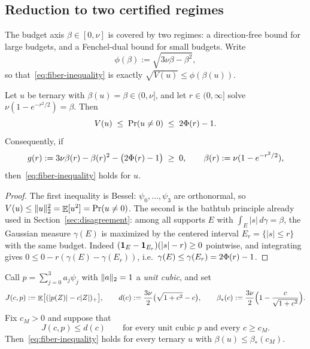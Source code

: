 \subsection{Reduction to two certified regimes}
\label{app:fq1-reduction}

The budget axis $\beta\in[0,\nu]$ is covered by two regimes: a direction-free bound for large budgets, and a Fenchel-dual bound for small budgets. Write
\[
        \phi(\beta):=\sqrt{3\nu\beta-\beta^2},
\]
so that~\eqref{eq:fiber-inequality} is exactly $\sqrt{V(u)}\le\phi(\beta(u))$.

\begin{lemma}\label{lem:highbudget}
Let $u$ be ternary with $\beta(u)=\beta\in(0,\nu]$, and let $r\in(0,\infty]$ solve $\nu(1-e^{-r^2/2})=\beta$. Then
\[
        V(u)\;\le\;\Pr(u\neq0)\;\le\;2\Phi(r)-1 .
\]
Consequently, if
\begin{equation}
        g(r):=3\nu\beta(r)-\beta(r)^2-\bigl(2\Phi(r)-1\bigr)\;\ge\;0,
        \qquad \beta(r):=\nu(1-e^{-r^2/2}),
        \label{eq:g-def}
\end{equation}
then~\eqref{eq:fiber-inequality} holds for $u$.
\end{lemma}

\begin{proof}
The first inequality is Bessel: $\psi_0,\ldots,\psi_3$ are orthonormal, so $V(u)\le\lVert u\rVert_2^2=\mathop{\mathbb{E}}[u^2]=\Pr(u\neq0)$. The second is the bathtub principle already used in Section~\ref{sec:disagreement}: among all supports $E$ with $\int_E|s|\,d\gamma=\beta$, the Gaussian measure $\gamma(E)$ is maximized by the centered interval $E_r=\{|s|\le r\}$ with the same budget. Indeed $(\mathbf 1_E-\mathbf 1_{E_r})(|s|-r)\ge0$ pointwise, and integrating gives $0\le 0-r(\gamma(E)-\gamma(E_r))$, i.e.\ $\gamma(E)\le\gamma(E_r)=2\Phi(r)-1$.
\end{proof}

\begin{lemma}\label{lem:dual-splice}
Call $p=\sum_{j=0}^3a_j\psi_j$ with $\lVert a\rVert_2=1$ a \emph{unit cubic}, and set
\[
        J(c,p):=\mathop{\mathbb{E}}\bigl[(|p(Z)|-c|Z|)_+\bigr],
        \qquad
        d(c):=\frac{3\nu}{2}\bigl(\sqrt{1+c^2}-c\bigr),
        \qquad
        \beta_*(c):=\frac{3\nu}{2}\Bigl(1-\frac{c}{\sqrt{1+c^2}}\Bigr).
\]
Fix $c_M>0$ and suppose that
\begin{equation}
        J(c,p)\le d(c)
        \qquad\text{for every unit cubic } p \text{ and every } c\ge c_M.
        \label{eq:dual-bound}
\end{equation}
Then~\eqref{eq:fiber-inequality} holds for every ternary $u$ with $\beta(u)\le\beta_*(c_M)$.
\end{lemma}

